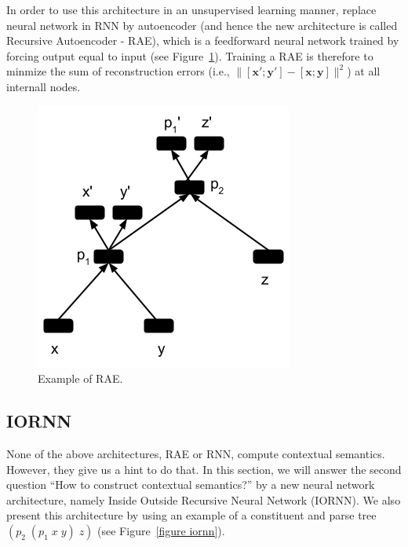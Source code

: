 \documentclass[11pt]{article}
\begin{document}
In order to use this architecture in an unsupervised learning manner, 
\cite{socher2011semi} replace neural network in RNN by autoencoder 
(and hence the new architecture is called Recursive Autoencoder - RAE), 
which is a feedforward neural network trained by forcing output equal to 
input (see Figure~\ref{figure rae}). Training a RAE is therefore to minmize 
the sum of reconstruction errors 
(i.e., $\|[\mathbf{x}';\mathbf{y}'] - [\mathbf{x};\mathbf{y}]\|^2$) at all internall nodes. 

\begin{figure}
	\center
	\includegraphics[scale=0.5]{RAE.png}
	\caption{Example of RAE.}
	\label{figure rae}
\end{figure}


\subsection{IORNN}
\label{subsection nlm}

None of the above architectures, RAE or RNN, compute contextual semantics. 
However, they give us a hint to do that. In this section, we will answer the second 
question ``How to construct contextual semantics?'' by a new neural network 
architecture, namely Inside Outside Recursive Neural Network (IORNN). We also 
present this architecture by using an example of a constituent and parse tree 
$(p_2 \; (p_1 \; x \; y) \; z)$ (see Figure~\ref{figure iornn}).
\end{document}
